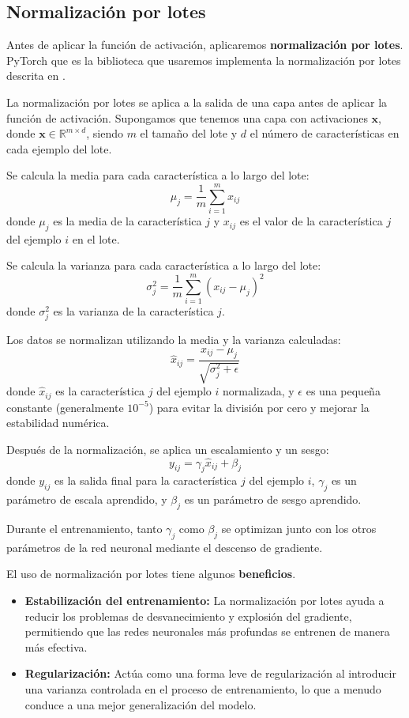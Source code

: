 \subsection{Normalización por lotes}

Antes de aplicar la función de activación, aplicaremos \textbf{normalización por lotes}.
PyTorch que es la biblioteca que usaremos implementa la normalización por lotes descrita en \cite{ioffe2015batch}.

La normalización por lotes se aplica a la salida de una capa antes de aplicar la función de activación. Supongamos que tenemos una capa con activaciones $\mathbf{x}$, donde $\mathbf{x} \in \mathbb{R}^{m \times d}$, siendo $m$ el tamaño del lote y $d$ el número de características en cada ejemplo del lote.

Se calcula la media para cada característica a lo largo del lote:
\[
\mu_j = \frac{1}{m} \sum_{i=1}^{m} x_{ij}
\]
donde $\mu_j$ es la media de la característica $j$ y $x_{ij}$ es el valor de la característica $j$ del ejemplo $i$ en el lote.

Se calcula la varianza para cada característica a lo largo del lote:
\[
\sigma_j^2 = \frac{1}{m} \sum_{i=1}^{m} (x_{ij} - \mu_j)^2
\]
donde $\sigma_j^2$ es la varianza de la característica $j$.


Los datos se normalizan utilizando la media y la varianza calculadas:
\[
\hat{x}_{ij} = \frac{x_{ij} - \mu_j}{\sqrt{\sigma_j^2 + \epsilon}}
\]
donde $\hat{x}_{ij}$ es la característica $j$ del ejemplo $i$ normalizada, y $\epsilon$ es una pequeña constante (generalmente $10^{-5}$) para evitar la división por cero y mejorar la estabilidad numérica.


Después de la normalización, se aplica un escalamiento y un sesgo:
\[
y_{ij} = \gamma_j \hat{x}_{ij} + \beta_j
\]
donde $y_{ij}$ es la salida final para la característica $j$ del ejemplo $i$, $\gamma_j$ es un parámetro de escala aprendido, y $\beta_j$ es un parámetro de sesgo aprendido.

Durante el entrenamiento, tanto $\gamma_j$ como $\beta_j$ se optimizan junto con los otros parámetros de la red neuronal mediante el descenso de gradiente.

El uso de normalización por lotes tiene algunos \textbf{beneficios}.
\begin{itemize}
	\item \textbf{Estabilización del entrenamiento:} La normalización por lotes ayuda a reducir los problemas de desvanecimiento y explosión del gradiente, permitiendo que las redes neuronales más profundas se entrenen de manera más efectiva.
	\item \textbf{Regularización:} Actúa como una forma leve de regularización al introducir una varianza controlada en el proceso de entrenamiento, lo que a menudo conduce a una mejor generalización del modelo.
\end{itemize}


